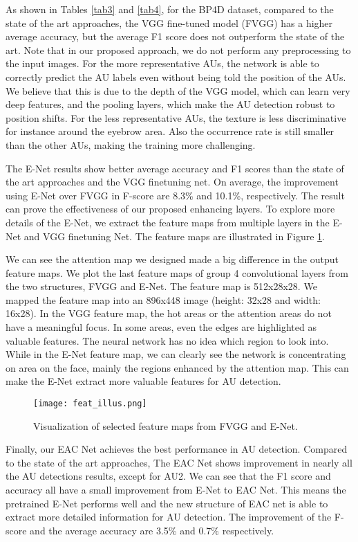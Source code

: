 \documentclass[a4paper, 10pt, conference]{ieeeconf}      %
\begin{document}
As shown in Tables \ref{tab3} and \ref{tab4}, for the BP4D dataset, compared to the state of the art approaches, the VGG fine-tuned model (FVGG) has a higher average accuracy, but the average F1 score does not outperform the state of the art. Note that in our proposed approach, we do not perform any preprocessing to the input images. For the more representative AUs, the network is able to correctly predict the AU labels even without being told the position of the AUs. We believe that this is due to the depth of the VGG model, which can learn very deep features, and the pooling layers, which make the AU detection robust to position shifts. For the less representative AUs, the texture is less discriminative for instance around the eyebrow area. Also the occurrence rate is still smaller than the other AUs, making the training more challenging.

The E-Net results show better average accuracy and F1 scores than the state of the art approaches and the VGG finetuning net.  On average, the improvement using E-Net over FVGG in F-score are 8.3\% and 10.1\%, respectively. The result can prove the effectiveness of our proposed enhancing layers. To explore more details of the E-Net, we extract the feature maps from multiple layers in the E-Net and VGG finetuning Net. The feature maps are illustrated in Figure \ref{fig6}.

We can see the attention map we designed made a big difference in the output feature maps. We plot the last feature maps of group 4 convolutional layers from the two structures, FVGG and E-Net. The feature map is 512x28x28. We mapped the feature map into an 896x448 image (height: 32x28 and width: 16x28). In the VGG feature map, the hot areas or the attention areas do not have a meaningful focus. In some areas, even the edges are highlighted as valuable features. The neural network has no idea which region to look into. While in the E-Net feature map, we can clearly see the network is concentrating on area on the face, mainly the regions enhanced by the attention map. This can make the E-Net extract more valuable features for AU detection.

 \begin{figure}[thpb]
      \centering
      \texttt{[image: feat\_illus.png]}
      \caption{Visualization of selected feature maps from FVGG and E-Net.}
      \label{fig6}
   \end{figure}
Finally, our EAC Net achieves the best performance in AU detection. Compared to the state of the art approaches, The EAC Net shows improvement in nearly all the AU detections results, except for AU2. We can see that the F1 score and accuracy all have a small improvement from E-Net to EAC Net. This means the pretrained E-Net performs well and the new structure of EAC net is able to extract more detailed information for AU detection. The improvement of the F-score and the average accuracy are 3.5\% and 0.7\% respectively.
\end{document}
